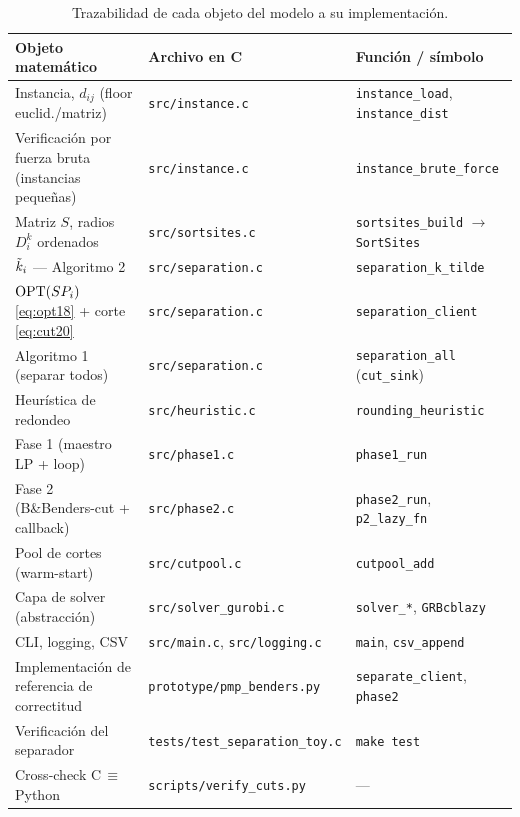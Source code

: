 \begin{table}[h]\centering\small
\begin{tabular}{>{\raggedright}p{5.2cm} l l}
\toprule
\textbf{Objeto matemático} & \textbf{Archivo en C} & \textbf{Función / símbolo} \\
\midrule
Instancia, $d_{ij}$ (floor euclid./matriz) & \texttt{src/instance.c} & \texttt{instance\_load}, \texttt{instance\_dist} \\
Verificación por fuerza bruta (instancias pequeñas) & \texttt{src/instance.c} & \texttt{instance\_brute\_force} \\
Matriz $S$, radios $D^k_i$ ordenados & \texttt{src/sortsites.c} & \texttt{sortsites\_build} $\to$ \texttt{SortSites} \\
$\tilde{k}_i$ — Algoritmo 2 & \texttt{src/separation.c} & \texttt{separation\_k\_tilde} \\
$\mathrm{OPT}(SP_i)$ \eqref{eq:opt18} + corte \eqref{eq:cut20} & \texttt{src/separation.c} & \texttt{separation\_client} \\
Algoritmo 1 (separar todos) & \texttt{src/separation.c} & \texttt{separation\_all} (\texttt{cut\_sink}) \\
Heurística de redondeo & \texttt{src/heuristic.c} & \texttt{rounding\_heuristic} \\
Fase 1 (maestro LP + loop) & \texttt{src/phase1.c} & \texttt{phase1\_run} \\
Fase 2 (B\&Benders-cut + callback) & \texttt{src/phase2.c} & \texttt{phase2\_run}, \texttt{p2\_lazy\_fn} \\
Pool de cortes (warm-start) & \texttt{src/cutpool.c} & \texttt{cutpool\_add} \\
Capa de solver (abstracción) & \texttt{src/solver\_gurobi.c} & \texttt{solver\_*}, \texttt{GRBcblazy} \\
CLI, logging, CSV & \texttt{src/main.c}, \texttt{src/logging.c} & \texttt{main}, \texttt{csv\_append} \\
\midrule
Implementación de referencia de correctitud & \texttt{prototype/pmp\_benders.py} & \texttt{separate\_client}, \texttt{phase2} \\
Verificación del separador & \texttt{tests/test\_separation\_toy.c} & \texttt{make test} \\
Cross-check C\,$\equiv$\,Python & \texttt{scripts/verify\_cuts.py} & — \\
\bottomrule
\end{tabular}
\caption{Trazabilidad de cada objeto del modelo a su implementación.}
\end{table}

